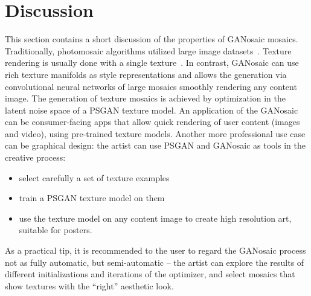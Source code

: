 \documentclass{article}
\begin{document}
\section{Discussion}%
\label{sec_discuss}
This section contains a short discussion of the properties of GANosaic mosaics.
Traditionally, photomosaic algorithms utilized large image datasets~\cite{photomosaic,JIM}. Texture rendering is usually done with a single texture~\cite{EfrosQ,GatysEB15a}. 
In contrast, GANosaic can use rich texture manifolds as style representations and allows the generation via convolutional neural networks of large mosaics smoothly rendering any content image. The generation of texture mosaics is achieved by optimization in the latent noise space of a PSGAN texture model. 
An application of the GANosaic can be consumer-facing apps that allow quick rendering of user content (images and video), using pre-trained texture models.
Another more professional use case can be graphical design: the artist can use PSGAN and GANosaic as tools in the creative process: 
\begin{itemize}
\item select carefully a set of texture examples
\item train a PSGAN texture model on them
\item use the texture model on any content image to create high resolution art, suitable for posters.
\end{itemize}
As a practical tip, it is recommended to the user to regard the GANosaic process not as fully automatic, but semi-automatic -- the artist can explore the results of different initializations and iterations of the optimizer,  and select mosaics that show textures with the ``right'' aesthetic look.
\end{document}
